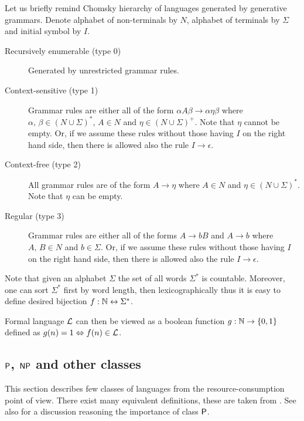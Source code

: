 		Let us briefly remind Chomsky hierarchy of languages generated by generative grammars. Denote alphabet of non-terminals by $N$, alphabet of terminals by $\Sigma$ and initial symbol by $I$.
		\begin{description}
			\item[Recursively enumerable (type 0)] Generated by unrestricted grammar rules.
			\item[Context-sensitive (type 1)] Grammar rules are either all of the form $\alpha A \beta \rightarrow \alpha \eta \beta$ where $\alpha,\,\beta\in (N\cup\Sigma)^*$, $A\in N$ and $\eta\in (N\cup\Sigma)^+$. Note that $\eta$ cannot be empty. Or, if we assume these rules without those having $I$ on the right hand side, then there is allowed also the rule $I\rightarrow \epsilon$.
			\item[Context-free (type 2)] All grammar rules are of the form $A\rightarrow\eta$ where $A\in N$ and $\eta\in (N\cup\Sigma)^*$. Note that $\eta$ can be empty.
			\item[Regular (type 3)] Grammar rules are either all of the forms $A\rightarrow bB$ and $A\rightarrow b$ where $A,\,B\in N$ and $b\in\Sigma$. Or, if we assume these rules without those having $I$ on the right hand side, then there is allowed also the rule $I\rightarrow \epsilon$.
		\end{description}
		
		\begin{remark}
			Note that given an alphabet $\Sigma$ the set of all words $\Sigma^*$ is countable. Moreover, one can sort $\Sigma^*$ first by word length, then lexicographically thus it is easy to define desired bijection $f: \N \leftrightarrow \Sigma^* $.
			
			Formal language ${\cal L}$ can then be viewed as a boolean function $g: \N \rightarrow \{0,1\}$ defined as
			$g(n) = 1 \iff f(n)\in {\cal L}$.
		\end{remark}
		
	
	\subsection{$\P$, $\NP$ and other classes}
	\label{sec:PNP}
		
		This section describes few classes of languages from the resource-consumption point of view. There exist many equivalent definitions, these are taken from \cite{book_comp}. See also \cite[Chapter 1.5.1]{book_comp} for a discussion reasoning the importance of class $\P$.
		
